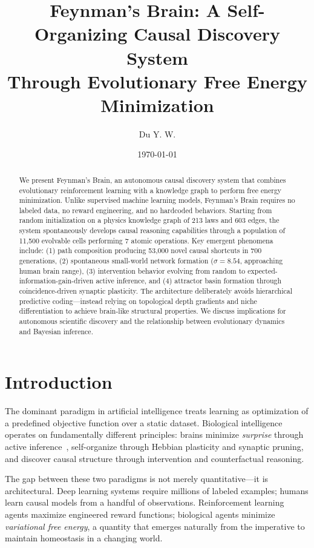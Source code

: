 \documentclass[aps,prl,reprint]{revtex4-2}
\begin{document}
\title{Feynman's Brain: A Self-Organizing Causal Discovery System\\Through Evolutionary Free Energy Minimization}

\author{Du Y. W.}

\date{\today}

\begin{abstract}
We present Feynman's Brain, an autonomous causal discovery system that combines
evolutionary reinforcement learning with a knowledge graph to perform free energy
minimization. Unlike supervised machine learning models, Feynman's Brain
requires no labeled data, no reward engineering, and no hardcoded behaviors.
Starting from random initialization on a physics knowledge graph of 213 laws
and 603 edges, the system spontaneously develops causal reasoning capabilities
through a population of 11,500 evolvable cells performing 7 atomic operations.
Key emergent phenomena include: (1) path composition producing 53,000 novel
causal shortcuts in 700 generations, (2) spontaneous small-world network
formation ($\sigma=8.54$, approaching human brain range), (3) intervention
behavior evolving from random to expected-information-gain-driven active
inference, and (4) attractor basin formation through coincidence-driven
synaptic plasticity. The architecture deliberately avoids hierarchical
predictive coding---instead relying on topological depth gradients and niche
differentiation to achieve brain-like structural properties. We discuss
implications for autonomous scientific discovery and the relationship between
evolutionary dynamics and Bayesian inference.
\end{abstract}

\section{Introduction}

The dominant paradigm in artificial intelligence treats learning as
optimization of a predefined objective function over a static dataset.
Biological intelligence operates on fundamentally different principles:
brains minimize \emph{surprise} through active inference~\cite{Friston2010},
self-organize through Hebbian plasticity and synaptic pruning, and discover
causal structure through intervention and counterfactual reasoning.

The gap between these two paradigms is not merely quantitative---it is
architectural. Deep learning systems require millions of labeled examples;
humans learn causal models from a handful of observations. Reinforcement
learning agents maximize engineered reward functions; biological agents
minimize \emph{variational free energy}, a quantity that emerges naturally
from the imperative to maintain homeostasis in a changing world.
\end{document}
